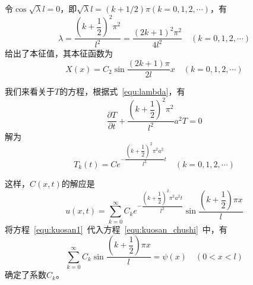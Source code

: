 \documentclass[a4paper,cs4size,adobefonts,fancyhdr]{ctexart}[2005/11/25]
\numberwithin{equation}{section} %
\begin{document}
令$\cos\sqrt{\lambda}l=0$，即$\sqrt{\lambda}l=(k+1/2)\pi(k=0,1,2,\cdots)$，有
\begin{equation}\label{equ:lambda}
\lambda = \dfrac{{\left(k+\dfrac{1}{2}\right)}^2\pi^2}{l^2}=\dfrac{{(2k+1)}^2\pi^2}{4l^2}\quad(k=0,1,2,\cdots)
\end{equation}
给出了本征值，其本征函数为
\begin{equation}
X(x)=C_2\sin\dfrac{(2k+1)\pi}{2l}x\quad(k=0,1,2,\cdots)
\end{equation}\par
我们来看关于$T$的方程，根据式~\ref{equ:lambda}，有
\begin{equation}
\dfrac{\partial T}{\partial t} + \dfrac{{\left(k+\dfrac{1}{2}\right)}^2\pi^2}{l^2}a^2T=0
\end{equation}
解为
\begin{equation}
T_k(t)=Ce^{-\dfrac{{\left(k+\dfrac{1}{2}\right)}^2\pi^2 a^2}{l^2}t}\quad(k=0,1,2,\cdots)
\end{equation}\par
这样，$C(x,t)$的解应是
\begin{equation}\label{equ:kuosan_jie1}
	u(x,t)= \sum_{k=0}^{\infty}C_ke^{-\dfrac{{\left(k+\dfrac{1}{2}\right)}^2\pi^2 a^2t}{l^2}}
		    \sin\dfrac{\left(k+\dfrac{1}{2}\right)\pi x}{l}
\end{equation}
将方程~\ref{equ:kuosan1}~代入方程~\ref{equ:kuosan_chushi}~中，有
\begin{equation}
\sum_{k=0}^{\infty} C_k\sin\dfrac{\left(k+\dfrac{1}{2}\right)\pi x}{l} = \psi(x)\quad(0<x<l)
\end{equation}
确定了系数$C_k$。
\end{document}
